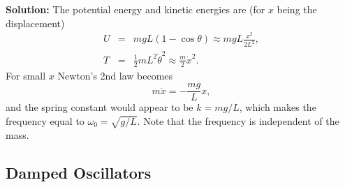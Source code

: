 {\bf Solution:} The potential energy and kinetic energies are (for $x$ being the displacement)
\begin{eqnarray*}
U&=&mgL(1-\cos\theta)\approx mgL\frac{x^2}{2L^2},\\
T&=&\frac{1}{2}mL^2\dot{\theta}^2\approx \frac{m}{2}\dot{x}^2.
\end{eqnarray*}
For small $x$ Newton's 2nd law becomes
\[
m\ddot{x}=-\frac{mg}{L}x,
\]
and the spring constant would appear to be $k=mg/L$, which makes the frequency equal to $\omega_0=\sqrt{g/L}$. Note that the frequency is independent of the mass.

\exampleend

\subsection{Damped Oscillators}

